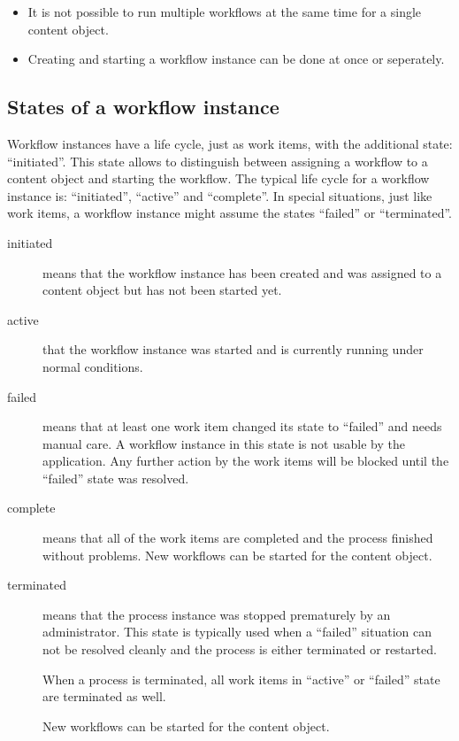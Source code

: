 \begin{notice}
    \begin{itemize}
    \item It is not possible to run multiple workflows at the same time for a single content object.
    \item Creating and starting a workflow instance can be done at once or seperately.
    \end{itemize}
\end{notice}

\subsection{States of a workflow instance}

Workflow instances have a life cycle, just as work items, with the additional
state: ``initiated''. This state allows to distinguish between assigning a
workflow to a content object and starting the workflow. The typical life cycle
for a workflow instance is: ``initiated'', ``active'' and ``complete''. In special
situations, just like work items, a workflow instance might assume the states
``failed'' or ``terminated''.  

  \begin{description}

      \item[initiated] means that the workflow instance has been created and
          was assigned to a content object but has not been started yet.

      \item[active] that the workflow instance was started and is currently
          running under normal conditions.

      \item[failed] means that at least one work item changed its state to
          ``failed'' and needs manual care. A workflow instance in this state
          is not usable by the application. Any further action by the work
          items will be blocked until the ``failed'' state was resolved.

      \item[complete] means that all of the work items are completed and the
          process finished without problems. 
          New workflows can be started for
          the content object.

      \item[terminated] means that the process instance was stopped prematurely
          by an administrator. This state is typically used when a ``failed''
          situation can not be resolved cleanly and the process is either terminated
          or restarted.

          When a process is terminated, all work items in ``active'' or
          ``failed'' state are terminated as well.

          New workflows can be started for the content object.

  \end{description}

